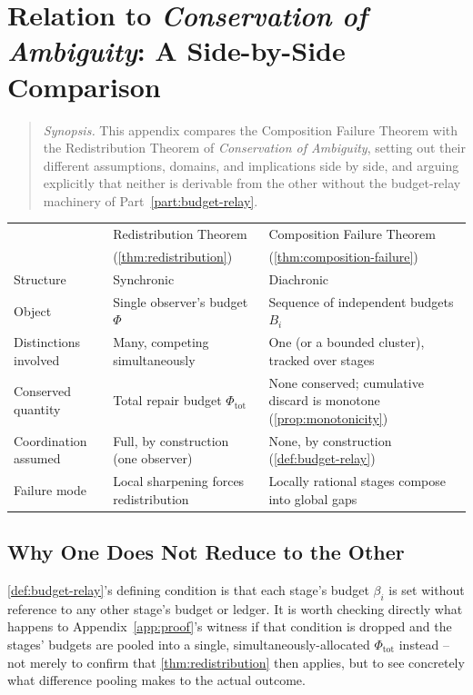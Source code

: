 \chapter{Relation to \emph{Conservation of Ambiguity}: A Side-by-Side Comparison}
\label{app:comparison}

\begin{quotation}
\noindent\textit{Synopsis.} This appendix compares the Composition Failure
Theorem with the Redistribution Theorem of \emph{Conservation of
Ambiguity}, setting out their different assumptions, domains, and
implications side by side, and arguing explicitly that neither is derivable
from the other without the budget-relay machinery of
Part~\ref{part:budget-relay}.
\end{quotation}


\begin{center}
\begin{tabular}{lll}
\toprule
& Redistribution Theorem & Composition Failure Theorem \\
& (\cref{thm:redistribution}) & (\cref{thm:composition-failure}) \\
\midrule
Structure & Synchronic & Diachronic \\
Object & Single observer's budget $\Phi$ & Sequence of independent budgets $B_i$ \\
Distinctions involved & Many, competing simultaneously & One (or a bounded cluster), tracked over stages \\
Conserved quantity & Total repair budget $\Phi_{\mathrm{tot}}$ & None conserved; cumulative discard is monotone (\cref{prop:monotonicity}) \\
Coordination assumed & Full, by construction (one observer) & None, by construction (\cref{def:budget-relay}) \\
Failure mode & Local sharpening forces redistribution & Locally rational stages compose into global gaps \\
\bottomrule
\end{tabular}
\end{center}

\section{Why One Does Not Reduce to the Other}

\cref{def:budget-relay}'s defining condition is that each stage's budget
$\beta_i$ is set without reference to any other stage's budget or ledger.
It is worth checking directly what happens to
Appendix~\ref{app:proof}'s witness if that condition is dropped and the
stages' budgets are pooled into a single, simultaneously-allocated
$\Phi_{\mathrm{tot}}$ instead -- not merely to confirm that
\cref{thm:redistribution} then applies, but to see concretely what
difference pooling makes to the actual outcome.

